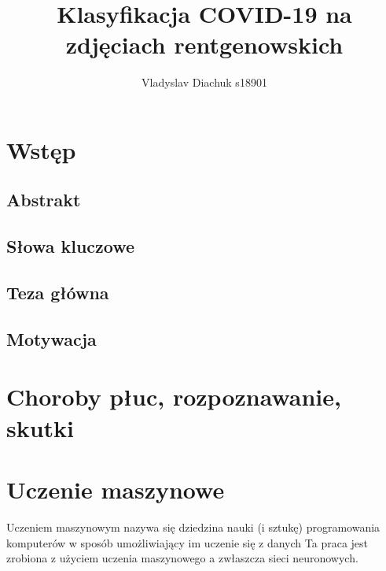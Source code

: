 \documentclass{article}
\title{Klasyfikacja COVID-19 na zdjęciach rentgenowskich}
\author{Vladyslav Diachuk s18901}
\begin{document}
\maketitle


\section{Wstęp}

\subsection{Abstrakt}


\subsection{Słowa kluczowe}


\subsection{Teza główna}

\subsection{Motywacja}


\section{Choroby płuc, rozpoznawanie, skutki}

\section{Uczenie maszynowe}
Uczeniem maszynowym nazywa się dziedzina nauki (i sztukę) programowania komputerów w sposób umożliwiający im uczenie się z danych \cite{geron} 
Ta praca jest zrobiona z użyciem uczenia maszynowego a zwłaszcza sieci neuronowych.
\end{document}
